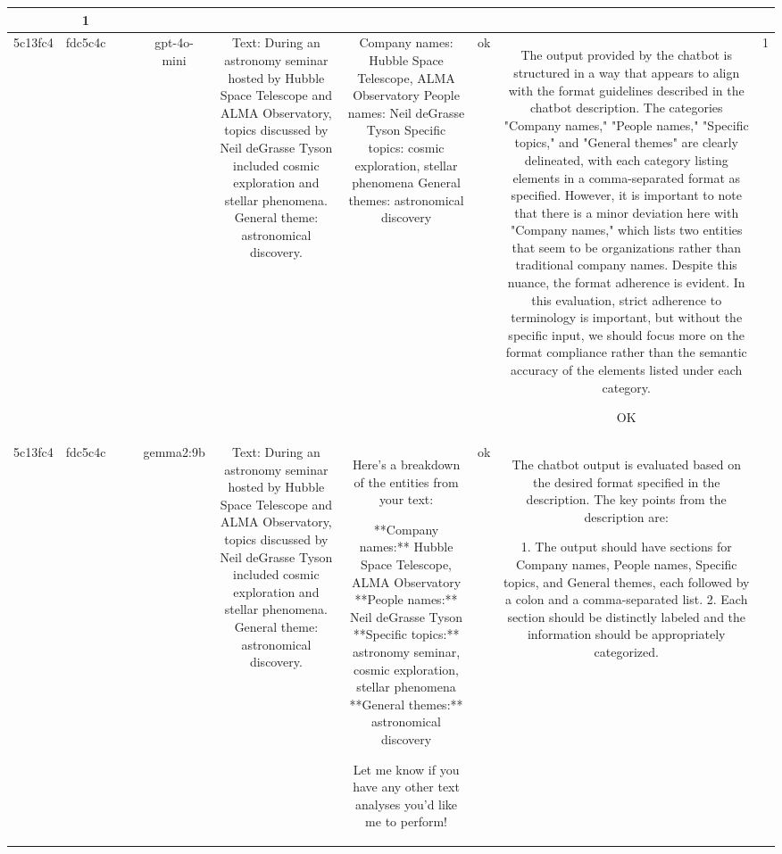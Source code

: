 \begin{table}[h!]
\begin{tabular}{|c|c|c|c|c|c|c|c|c|c|}
{ERR & 1\\
\hline
5c13fc4 & fdc5c4c &  &  & gpt-4o-mini & Text: During an astronomy seminar hosted by Hubble Space Telescope and ALMA Observatory, topics discussed by Neil deGrasse Tyson included cosmic exploration and stellar phenomena. General theme: astronomical discovery. & Company names: Hubble Space Telescope, ALMA Observatory
People names: Neil deGrasse Tyson
Specific topics: cosmic exploration, stellar phenomena
General themes: astronomical discovery & ok & The output provided by the chatbot is structured in a way that appears to align with the format guidelines described in the chatbot description. The categories "Company names," "People names," "Specific topics," and "General themes" are clearly delineated, with each category listing elements in a comma-separated format as specified. However, it is important to note that there is a minor deviation here with "Company names," which lists two entities that seem to be organizations rather than traditional company names. Despite this nuance, the format adherence is evident. In this evaluation, strict adherence to terminology is important, but without the specific input, we should focus more on the format compliance rather than the semantic accuracy of the elements listed under each category.

OK & 1\\
\hline
5c13fc4 & fdc5c4c &  &  & gemma2:9b & Text: During an astronomy seminar hosted by Hubble Space Telescope and ALMA Observatory, topics discussed by Neil deGrasse Tyson included cosmic exploration and stellar phenomena. General theme: astronomical discovery. & Here's a breakdown of the entities from your text:

**Company names:** Hubble Space Telescope, ALMA Observatory 
**People names:** Neil deGrasse Tyson
**Specific topics:** astronomy seminar, cosmic exploration, stellar phenomena
**General themes:** astronomical discovery 



Let me know if you have any other text analyses you'd like me to perform! & ok & The chatbot output is evaluated based on the desired format specified in the description. The key points from the description are:

1. The output should have sections for Company names, People names, Specific topics, and General themes, each followed by a colon and a comma-separated list.
2. Each section should be distinctly labeled and the information should be appropriately categorized.

}
\end{tabular}
\end{table}
